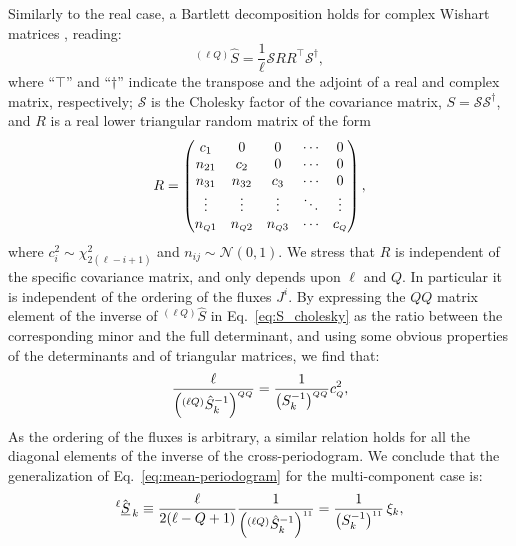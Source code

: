 Similarly to the real case, a Bartlett decomposition \citep{kshirsagar1959} holds for complex Wishart matrices \citep{Nagar2011}, reading:
\begin{equation}
{}^{(\ell Q)\!}\hat{S} = \frac{1}{\ell} \mathcal{S} R R^\top \mathcal{S}^{\dagger},  \label{eq:S_cholesky}
\end{equation}
where ``$\top$'' and ``$\dagger$'' indicate the transpose and the adjoint of a real and complex matrix, respectively; $\mathcal{S}$ is the Cholesky factor of the covariance matrix, $S= \mathcal{S} \mathcal{S}^{\dagger}$, and $R$ is a real lower triangular random matrix of the form
\begin{equation}
 R =
 \begin{pmatrix}
 c_1 & 0 & 0 & \cdots & 0\\
 n_{21} &  c_2 &0 & \cdots& 0 \\
 n_{31} &  n_{32} &  c_3 & \cdots & 0\\
\vdots & \vdots & \vdots &\ddots & \vdots \\
 n_{{\scriptscriptstyle Q}1} & n_{{\scriptscriptstyle Q}2} & n_{{\scriptscriptstyle Q}3} &\cdots & c_{\scriptscriptstyle Q}
 \end{pmatrix},
\end{equation}
where $c^2_i \sim \chi^2_{2(\ell-i+1)}$ and $ n_{ij}\sim \mathcal{N}(0,1)$. We stress that $R$ is independent of the specific covariance matrix, and only depends upon $\ell$ and $Q$. In particular it is independent of the ordering of the fluxes $J^i$. By expressing the $QQ$ matrix element of the inverse of $^{(\ell Q)}\hat{S}$ in Eq.~\eqref{eq:S_cholesky} as the ratio between the corresponding minor and the full determinant, and using some obvious properties of the determinants and of triangular matrices, we find that:
\begin{equation}
\frac{\ell}{\left({}^{(\ell Q)}\hat{S}_k^{-1}\right)^{\smallQ\smallQ}} = \frac{1}{\left(S_k^{-1}\right)^{\smallQ\smallQ}} c^2_\smallQ, \label{eq:S-1_choleskied}
\end{equation}
As the ordering of the fluxes is arbitrary, a similar relation holds for all the diagonal elements of the inverse of the cross-periodogram. We conclude that the generalization of Eq.~\eqref{eq:mean-periodogram} for the multi-component case is:
\begin{equation}
   ^{\ell}\hat{\underline{S}}_{\,k}\equiv\frac{\ell}{2(\ell-Q+1)}\frac{1}{\left( {}^{(\ell Q)}\hat{S}_k^{-1} \right)^{\smallone\smallone}} = \frac{1}{\left(S_k^{-1}\right)^{\smallone\smallone}} \, \xi_k, \label{eq:mean-multi-periodogram}
\end{equation}
